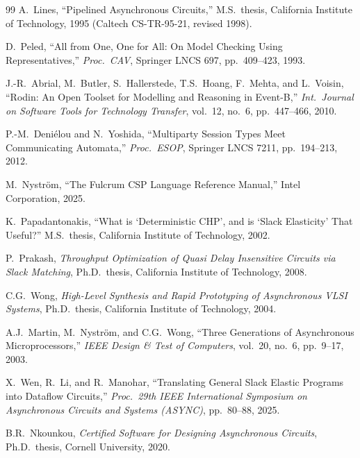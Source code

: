 \documentclass[11pt]{article}
\begin{document}
\begin{thebibliography}{99}
A.\ Lines,
``Pipelined Asynchronous Circuits,''
M.S.\ thesis, California Institute of Technology, 1995
(Caltech CS-TR-95-21, revised 1998).

D.\ Peled,
``All from One, One for All: On Model Checking Using Representatives,''
\textit{Proc.\ CAV}, Springer LNCS 697, pp.\ 409--423, 1993.

J.-R.\ Abrial, M.\ Butler, S.\ Hallerstede, T.S.\ Hoang, F.\ Mehta,
and L.\ Voisin,
``Rodin: An Open Toolset for Modelling and Reasoning in Event-B,''
\textit{Int.\ Journal on Software Tools for Technology Transfer},
vol.\ 12, no.\ 6, pp.\ 447--466, 2010.

P.-M.\ Deni\'elou and N.\ Yoshida,
``Multiparty Session Types Meet Communicating Automata,''
\textit{Proc.\ ESOP}, Springer LNCS 7211, pp.\ 194--213, 2012.

M.\ Nystr\"om,
``The Fulcrum CSP Language Reference Manual,''
Intel Corporation, 2025.

K.\ Papadantonakis,
``What is `Deterministic CHP', and is `Slack Elasticity' That
Useful?''
M.S.\ thesis, California Institute of Technology, 2002.

P.\ Prakash,
\textit{Throughput Optimization of Quasi Delay Insensitive Circuits
via Slack Matching},
Ph.D.\ thesis, California Institute of Technology, 2008.

C.G.\ Wong,
\textit{High-Level Synthesis and Rapid Prototyping of Asynchronous
VLSI Systems},
Ph.D.\ thesis, California Institute of Technology, 2004.

A.J.\ Martin, M.\ Nystr\"om, and C.G.\ Wong,
``Three Generations of Asynchronous Microprocessors,''
\textit{IEEE Design \& Test of Computers}, vol.\ 20, no.\ 6,
pp.\ 9--17, 2003.

X.\ Wen, R.\ Li, and R.\ Manohar,
``Translating General Slack Elastic Programs into Dataflow Circuits,''
\textit{Proc.\ 29th IEEE International Symposium on Asynchronous
Circuits and Systems (ASYNC)}, pp.\ 80--88, 2025.

B.R.\ Nkounkou,
\textit{Certified Software for Designing Asynchronous Circuits},
Ph.D.\ thesis, Cornell University, 2020.

\end{thebibliography}
\end{document}

